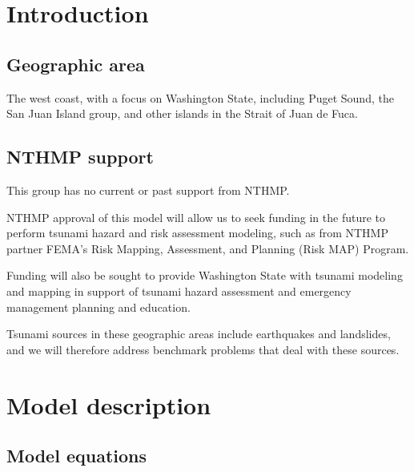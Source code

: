 
\vskip 5pt
\section{Introduction}

\subsection{Geographic area}  The west coast, with a focus on Washington State,
including Puget Sound, the San Juan Island group, and other islands in the
Strait of Juan de Fuca.



\subsection{NTHMP support}
This group has no current or past support from NTHMP.

NTHMP approval of this model will allow us to seek funding in the
future to perform tsunami hazard and risk assessment modeling, such as
from NTHMP partner FEMA’s Risk Mapping,
Assessment, and Planning (Risk MAP) Program.

Funding will also be sought to provide Washington State with tsunami
modeling and mapping in support of tsunami hazard assessment and emergency
management planning and education.  

Tsunami sources in these geographic
areas include earthquakes and landslides, and we will therefore address
benchmark problems that deal with these sources.

\section{Model description}

\subsection{Model equations}

